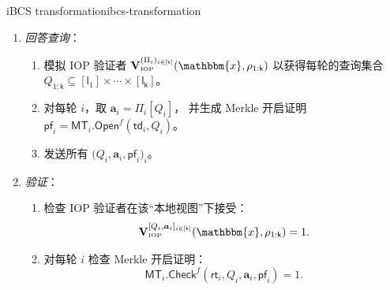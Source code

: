 \documentclass[american,singlepageview]{snargs-book-zh}
\renewcommand{\vec}[1]{\bm{#1}}
\newcommand{\Instance}{\mathbbm{x}}
\newcommand{\ProtoVerifier}{V}
\newcommand{\ProtoRoundComplexity}{\mathsf{k}}
\newcommand{\ProtoProofLength}{\mathsf{l}}
\newcommand{\RoundIndex}{i}
\newcommand{\IOPSubscript}{\scriptscriptstyle\mathrm{IOP}}
\newcommand{\IOPFormat}[1]{\mathbf{#1}}
\newcommand{\IOPVerifier}{\IOPFormat{\ProtoVerifier}_{\IOPSubscript}}
\newcommand{\IOPString}{\Pi}
\newcommand{\IOPEntry}{a}
\newcommand{\IOPEntries}{\vec{\IOPEntry}}
\newcommand{\IOPQuerySet}{Q}
\newcommand{\IOPVerifierRandomMessage}{\rho}
\newcommand{\IOPRoundComplexity}{\ProtoRoundComplexity}
\newcommand{\IOPProofLength}{\ProtoProofLength}
\newcommand{\IOPStrings}{(\IOPString_{\RoundIndex})_{\RoundIndex \in [\IOPRoundComplexity]}}
\newcommand{\IOPLocalView}[2]{[#1_{\RoundIndex},#2_{\RoundIndex}]_{\RoundIndex \in [\IOPRoundComplexity]}}
\newcommand{\ROFunction}{f}
\newcommand{\MTSymbol}{\mathsf{MT}}
\newcommand{\MTCommitment}{\mathsf{rt}}
\newcommand{\MTTrapdoor}{\mathsf{td}}
\newcommand{\MTProof}{\mathsf{pf}}
\newcommand{\MTIdxOpen}[1]{\MTSymbol_{#1}.\mathsf{Open}}
\newcommand{\MTIdxCheck}[1]{\MTSymbol_{#1}.\mathsf{Check}}
\newcommand{\IBCSText}{iBCS transformation\xspace}
\begin{document}
\begin{ImportantConstruction}{\IBCSText}{ibcs-transformation}
\begin{enumerate}
\item \emph{回答查询}：
  \begin{enumerate}[nolistsep]
    \item 模拟 IOP 验证者
      \(\IOPVerifier^{\IOPStrings}(\Instance,\IOPVerifierRandomMessage_{1:\IOPRoundComplexity})\)
      以获得每轮的查询集合
      \(\IOPQuerySet_{1:\IOPRoundComplexity}\subseteq[\IOPProofLength_{1}]\times\cdots\times[\IOPProofLength_{\IOPRoundComplexity}]\)。
    \item 对每轮 $\RoundIndex$，取
      \(\IOPEntries_{\RoundIndex}=
        \IOPString_{\RoundIndex}[\IOPQuerySet_{\RoundIndex}]\)，
      并生成 Merkle 开启证明
      \(\MTProof_{\RoundIndex}
        =\MTIdxOpen{\RoundIndex}^{\ROFunction}(\MTTrapdoor_{\RoundIndex},\IOPQuerySet_{\RoundIndex})\)。
    \item 发送所有
      \(\bigl(\IOPQuerySet_{\RoundIndex},\IOPEntries_{\RoundIndex},\MTProof_{\RoundIndex}\bigr)_{\RoundIndex}\)。
  \end{enumerate}

\item \emph{验证}：
  \begin{enumerate}[nolistsep]
    \item 检查 IOP 验证者在该“本地视图”下接受：
      \[
        \IOPVerifier^{\IOPLocalView{\IOPQuerySet}{\IOPEntries}}
          (\Instance,\IOPVerifierRandomMessage_{1:\IOPRoundComplexity})=1.
      \]
    \item 对每轮 $\RoundIndex$ 检查 Merkle 开启证明：
      \[
        \MTIdxCheck{\RoundIndex}^{\ROFunction}
          (\MTCommitment_{\RoundIndex},
           \IOPQuerySet_{\RoundIndex},
           \IOPEntries_{\RoundIndex},
           \MTProof_{\RoundIndex})=1.
      \]
  \end{enumerate}

\end{enumerate}
\end{ImportantConstruction}
\end{document}
